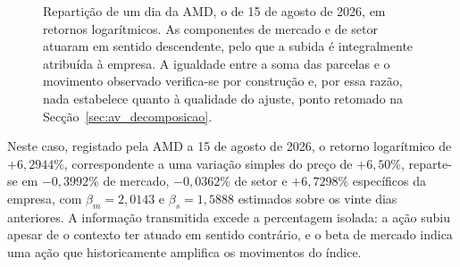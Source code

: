 \begin{figure}[ht]
\centering
{}
\caption[Um movimento repartido em três parcelas]{Repartição de um dia da AMD, o de 15 de agosto de
2026, em retornos logarítmicos. As componentes de mercado e de setor atuaram em sentido
descendente, pelo que a subida é integralmente atribuída à empresa. A igualdade entre a soma das
parcelas e o movimento observado verifica-se por construção e, por essa razão, nada estabelece
quanto à qualidade do ajuste, ponto retomado na Secção~\ref{sec:av_decomposicao}.}
\label{fig:met_decomposicao}
\end{figure}

Neste caso, registado pela AMD a 15 de agosto de 2026, o retorno logarítmico de $+6{,}2944\%$,
correspondente a uma variação simples do preço de $+6{,}50\%$, reparte-se em $-0{,}3992\%$ de mercado, $-0{,}0362\%$ de setor e $+6{,}7298\%$ específicos da
empresa, com $\beta_m = 2{,}0143$ e $\beta_s = 1{,}5888$ estimados sobre os vinte dias anteriores.
A informação transmitida excede a percentagem isolada: a ação subiu apesar de o contexto ter
atuado em sentido contrário, e o beta de mercado indica uma ação que historicamente amplifica os
movimentos do índice.

